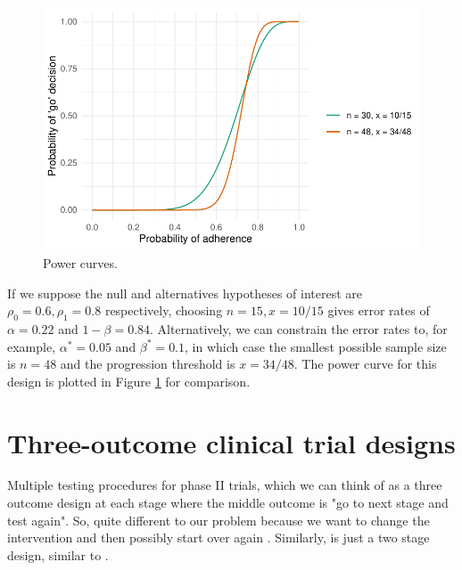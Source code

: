 \documentclass[sagev, Crown]{sagej} %
\begin{document}
\begin{figure}
\centering
\includegraphics[scale=0.8]{./figures/power}
\caption{Power curves.}
\label{fig:power}
\end{figure}

If we suppose the null and alternatives hypotheses of interest are $\rho_0 = 0.6, \rho_1 = 0.8$ respectively, choosing $n = 15, x = 10/15$ gives error rates of $\alpha = 0.22$ and $1 - \beta = 0.84$. Alternatively, we can constrain the error rates to, for example, $\alpha^* = 0.05$ and $\beta^* = 0.1$, in which case the smallest possible sample size is $n = 48$ and the progression threshold is $x = 34/48$. The power curve for this design is plotted in Figure \ref{fig:power} for comparison. 


\section{Three-outcome clinical trial designs}\label{sec:review}

Multiple testing procedures for phase II trials, which we can think of as a three outcome design at each stage where the middle outcome is "go to next stage and test again". So, quite different to our problem because we want to change the intervention and then possibly start over again \cite{Fleming1982}. Similarly, \cite{Shuster2002} is just a two stage design, similar to \cite{Simon1989}. 
\end{document}
